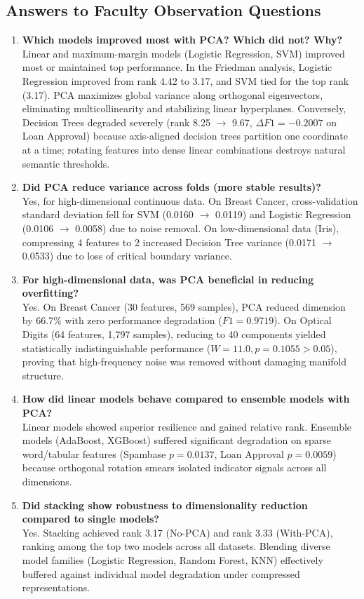 \documentclass[12pt,a4paper]{article}
\begin{document}
\subsection{Answers to Faculty Observation Questions}
\begin{enumerate}
    \item \textbf{Which models improved most with PCA? Which did not? Why?} \\
    Linear and maximum-margin models (Logistic Regression, SVM) improved most or maintained top performance. In the Friedman analysis, Logistic Regression improved from rank 4.42 to 3.17, and SVM tied for the top rank (3.17). PCA maximizes global variance along orthogonal eigenvectors, eliminating multicollinearity and stabilizing linear hyperplanes. Conversely, Decision Trees degraded severely (rank 8.25 $\to$ 9.67, $\Delta F1 = -0.2007$ on Loan Approval) because axis-aligned decision trees partition one coordinate at a time; rotating features into dense linear combinations destroys natural semantic thresholds.
    \item \textbf{Did PCA reduce variance across folds (more stable results)?} \\
    Yes, for high-dimensional continuous data. On Breast Cancer, cross-validation standard deviation fell for SVM (0.0160 $\to$ 0.0119) and Logistic Regression (0.0106 $\to$ 0.0058) due to noise removal. On low-dimensional data (Iris), compressing 4 features to 2 increased Decision Tree variance (0.0171 $\to$ 0.0533) due to loss of critical boundary variance.
    \item \textbf{For high-dimensional data, was PCA beneficial in reducing overfitting?} \\
    Yes. On Breast Cancer (30 features, 569 samples), PCA reduced dimension by 66.7\% with zero performance degradation ($F1 = 0.9719$). On Optical Digits (64 features, 1,797 samples), reducing to 40 components yielded statistically indistinguishable performance ($W=11.0, p=0.1055 > 0.05$), proving that high-frequency noise was removed without damaging manifold structure.
    \item \textbf{How did linear models behave compared to ensemble models with PCA?} \\
    Linear models showed superior resilience and gained relative rank. Ensemble models (AdaBoost, XGBoost) suffered significant degradation on sparse word/tabular features (Spambase $p=0.0137$, Loan Approval $p=0.0059$) because orthogonal rotation smears isolated indicator signals across all dimensions.
    \item \textbf{Did stacking show robustness to dimensionality reduction compared to single models?} \\
    Yes. Stacking achieved rank 3.17 (No-PCA) and rank 3.33 (With-PCA), ranking among the top two models across all datasets. Blending diverse model families (Logistic Regression, Random Forest, KNN) effectively buffered against individual model degradation under compressed representations.
\end{enumerate}
\end{document}

